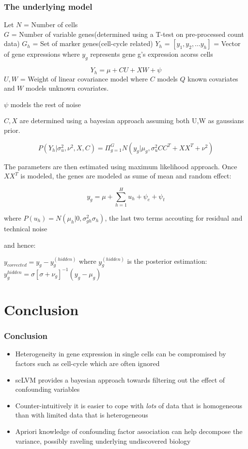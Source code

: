 \documentclass[10pt, compress]{beamer}
\renewcommand{\(}{\begin{columns}}
\renewcommand{\)}{\end{columns}}
\newcommand{\<}[1]{\begin{column}{#1}}
\renewcommand{\>}{\end{column}}
\begin{document}
\begin{frame}%
\frametitle{The underlying model}
Let $N$ = Number of cells \\
$G$ = Number of variable genes(determined using a T-test on pre-processed count data)
$G_h$ = Set of marker genes(cell-cycle related)
$Y_h$ = $[y_1, y_2, ... y_h]$ = Vector of gene expressions  where $y_g$ represents gene g's expression acorss cells

\begin{equation}
Y_h = \mu + CU + XW + \psi
\end{equation}
$U,W$ = Weight of linear covariance model where $C$ models $Q$ known covariates and $W$ models unknown covariates.

$\psi$ models the rest of noise

$C,X$ are determined using a bayesian approach assuming both U,W as gaussians prior.

\begin{equation}
P(Y_h|\sigma_u^2, \nu^2, X, C) = \Pi_{g=1}^{G} N(y_g|\mu_g, {\sigma_u^2CC^T+XX^T+\nu^2} )
\end{equation}
\end{frame}

\begin{frame}%
The parameters are then estimated using maximum likelihood approach. Once $XX^T$ is modeled, the genes are modeled
as sume of mean and random effect:

\begin{equation}
y_g = \mu + \sum_{h=1}^Hu_h + \psi_e + \psi_t
\end{equation}

where $P(u_h)=N(\mu_h|0, \sigma_{gh}^2\sigma_h)$, the last two terms accouting for residual and technical noise

and hence:

$y_{corrected} = y_g - y_g^{(hidden)}$
where $y_g^{(hidden)}$ is the posterior estimation:
$y_g^{hidden} = \sigma[\sigma +\nu_g]^{-1}(y_g-\mu_g)$
\end{frame}

\section{Conclusion}
\begin{frame}[fragile]
\frametitle{Conclusion}
\begin{itemize}
\item Heterogeneity in gene expression in single cells can be compromised by factors such as cell-cycle which are often ignored
\item scLVM provides a bayesian approach towards filtering out the effect of confounding variables
\item Counter-intuitively it is easier to cope with \textit{lots} of data that is homogeneous than with limited data that is heterogeneous
\item Apriori knowledge of confounding factor association can help decompose the variance, possibly raveling underlying undiscovered biology
\end{itemize}
\end{frame}
\end{document}
